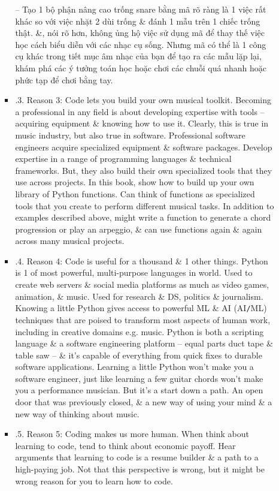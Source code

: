\documentclass{article}
\begin{document}
\begin{itemize}
\begin{itemize}
\begin{itemize}
			-- Tạo 1 bộ phận nâng cao trống snare bằng mã rõ ràng là 1 việc rất khác so với việc nhặt 2 dùi trống \& đánh 1 mẫu trên 1 chiếc trống thật. \&, nói rõ hơn, không ủng hộ việc sử dụng mã để thay thế việc học cách biểu diễn với các nhạc cụ sống. Nhưng mã có thể là 1 công cụ khác trong tiết mục âm nhạc của bạn để tạo ra các mẫu lặp lại, khám phá các ý tưởng toán học hoặc chơi các chuỗi quá nhanh hoặc phức tạp để chơi bằng tay.
			\item {.3. Reason 3: Code lets you build your own musical toolkit.} Becoming a professional in any field is about developing expertise with tools -- acquiring equipment \& knowing how to use it. Clearly, this is true in music industry, but also true in software. Professional software engineers acquire specialized equipment \& software packages. Develop expertise in a range of programming languages \& technical frameworks. But, they also build their own specialized tools that they use across projects. In this book, show how to build up your own library of Python functions. Can think of functions as specialized tools that you create to perform different musical tasks. In addition to examples described above, might write a function to generate a chord progression or play an arpeggio, \& can use functions again \& again across many musical projects.
			\item {.4. Reason 4: Code is useful for a thousand \& 1 other things.} Python is 1 of most powerful, multi-purpose languages in world. Used to create web servers \& social media platforms as much as video games, animation, \& music. Used for research \& DS, politics \& journalism. Knowing a little Python gives access to powerful ML \& AI (AI{\tt/}ML) techniques that are poised to transform most aspects of human work, including in creative domains e.g. music. Python is both a scripting language \& a software engineering platform -- equal parts duct tape \& table saw -- \& it's capable of everything from quick fixes to durable software applications. Learning a little Python won't make you a software engineer, just like learning a few guitar chords won't make you a performance musician. But it's a start down a path. An open door that was previously closed, \& a new way of using your mind \& a new way of thinking about music.
			\item {.5. Reason 5: Coding makes us more human.} When think about learning to code, tend to think about economic payoff. Hear arguments that learning to code is a resume builder \& a path to a high-paying job. Not that this perspective is wrong, but it might be wrong reason for you to learn how to code.
			

\end{itemize}
\end{itemize}
\end{itemize}
\end{document}
